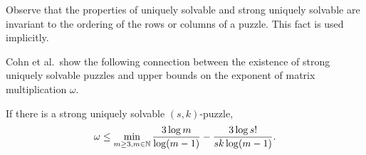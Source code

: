 \documentclass[11pt]{article}
\newcommand\Sym[1]{\ensuremath{\mathrm{Sym}_{#1}}}
\begin{document}
\noindent Observe that the properties of uniquely solvable and strong uniquely
solvable are invariant to the ordering of the rows or columns of a
puzzle.  This fact is used implicitly.

Cohn et al.~show the following connection between the existence of
strong uniquely solvable puzzles and upper bounds on the exponent of
matrix multiplication $\omega$.
\begin{lemma}
  \label{lem:omega}
  If there is a strong uniquely solvable $(s,k)$-puzzle,
  $$\omega \le \min_{m \ge 3, m \in \mathbb{N}} \frac{3 \log
    m}{\log(m-1)} - \frac{3 \log s!}{sk \log(m-1)}.$$
\end{lemma}

\end{document}

